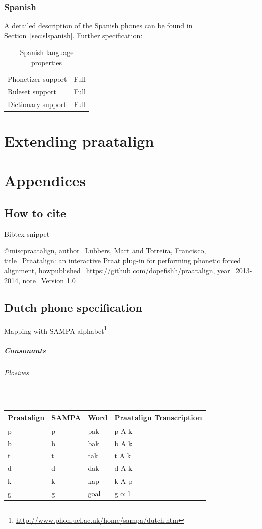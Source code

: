 \documentclass[twoside,a4paper]{book}
\begin{document}
\subsection{Spanish}
A detailed description of the Spanish phones can be found in
Section~\ref{sec:slspanish}. Further specification:
\begin{table}[H]
	\caption{Spanish language properties}
	\begin{tabular}{ll}
		Phonetizer support & Full\\
		Ruleset support & Full\\
		Dictionary support &  Full
	\end{tabular}
\end{table}

\chapter{Extending praatalign}

\chapter{Appendices}
\section{How to cite}
\begin{listing}[H]
	\centering
	\caption{Bibtex snippet}
	\begin{latexcode}
@misc{praatalign,
	author={Lubbers, Mart and Torreira, Francisco},
	title={Praatalign: an interactive Praat plug-in for performing phonetic forced alignment},
	howpublished={\url{https://github.com/dopefishh/praatalign}},
	year={2013-2014},
	note={Version 1.0}
}
	\end{latexcode}
\end{listing}

\newpage
\section{Dutch phone specification}
\label{sec:sldutch}
Mapping with SAMPA
alphabet\footnote{\url{http://www.phon.ucl.ac.uk/home/sampa/dutch.htm}}

\paragraph{Consonants}
\subparagraph{Plosives}\strut\\
\begin{tabular}{llll}
	Praatalign & SAMPA & Word & Praatalign Transcription\\
	\hline
		p & p & pak & p A k\\
		b & b & bak & b A k\\
		t & t & tak & t A k\\
		d & d & dak & d A k\\
		k & k & kap & k A p\\
		g & g & goal & g o: l
\end{tabular}
\end{document}
